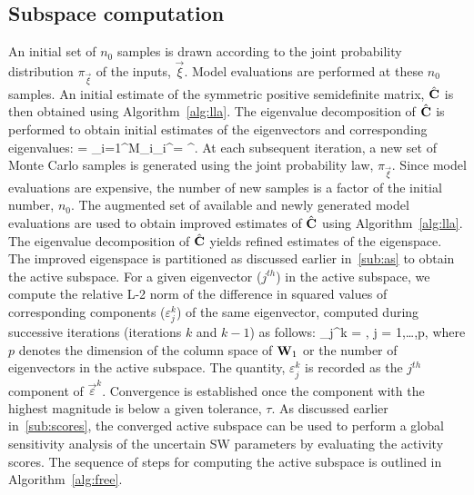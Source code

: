 \subsection{Subspace computation}
\label{sub:subspace} 

An initial set of $n_0$ samples is drawn according to the joint probability distribution
$\pi_{\vec{\xi}}$ of the inputs, $\vec{\xi}$. Model evaluations are performed at these
$n_0$ samples. 
An initial estimate of the symmetric positive semidefinite matrix, $\hat{\mathbf{{C}}}$ 
is then obtained using Algorithm~\ref{alg:lla}. The eigenvalue decomposition of 
$\hat{\mathbf{{C}}}$ is performed to obtain initial estimates of the eigenvectors and
corresponding eigenvalues:
%
\be
{} = \sum\limits_{i=1}^{M}_i_i^\top = \hat{\bm{\Lambda}}^\top.
\ee
%
At each subsequent iteration, a new set of Monte Carlo samples is generated using the joint 
probability law, $\pi_{\vec{\xi}}$. Since model evaluations are expensive, the number of new samples
is a factor of the initial number, $n_0$. The augmented set of available and newly generated model
evaluations are used to obtain improved estimates of $\hat{\mathbf{{C}}}$ using Algorithm~\ref{alg:lla}.
The eigenvalue decomposition of $\hat{\mathbf{{C}}}$ yields refined estimates of the eigenspace.
The improved eigenspace is partitioned as discussed earlier in~\ref{sub:as}
 to obtain the active subspace. For a given eigenvector ($j^{th}$) in the active subspace, 
 we compute the relative L-2 
 norm of the difference in squared values of corresponding components ($\varepsilon_j^k$) of the same eigenvector,
 computed during successive iterations (iterations $k$ and $k-1$) as follows:
%
\be
\varepsilon_j^k = , 
                       j = 1,\ldots,p,
\label{eq:conv}
\ee
%
where $p$ denotes the dimension of the column space of $\mathbf{{W}}_1$ or the number of eigenvectors in
the active subspace.
The quantity, $\varepsilon_j^k$ is recorded as the $j^{th}$ component of $\vec\varepsilon^k$. Convergence is
established once the component with the highest magnitude is below a given tolerance, $\tau$. 
As discussed earlier in~\ref{sub:scores}, the converged active subspace can be used to perform
a global sensitivity analysis of the uncertain SW parameters by evaluating the activity scores. 
The sequence of steps for computing the active subspace is outlined
in Algorithm~\ref{alg:free}.
%
\bigskip
